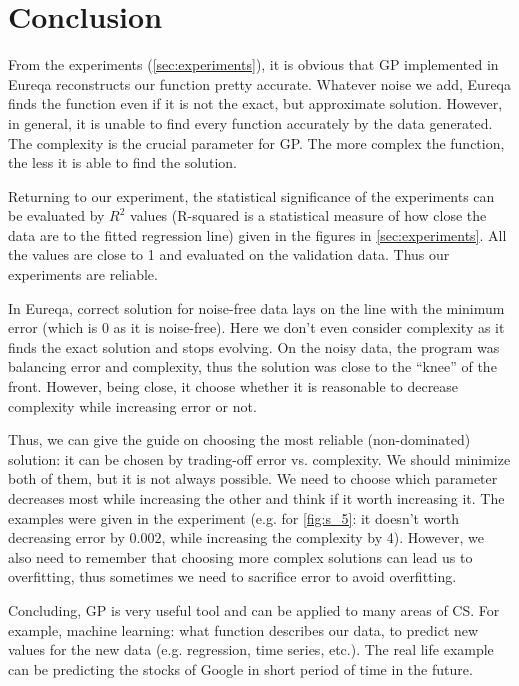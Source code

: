 \documentclass[12pt]{article}
\begin{document}
\section{Conclusion}
    From the experiments (\autoref{sec:experiments}), it is obvious that GP
    implemented in Eureqa reconstructs our function pretty accurate. Whatever
    noise we add, Eureqa finds the function even if it is not the exact, but approximate
    solution. However, in general, it is unable to find every function accurately
    by the data generated. The complexity is the crucial parameter for GP. The more
    complex the function, the less it is able to find the solution.

    Returning to our experiment, the statistical significance of the experiments
    can be evaluated by $R^2$ values (R-squared is a statistical measure of how
    close the data are to the fitted regression line) given in the figures in
    \autoref{sec:experiments}. All the values are close to 1 and evaluated on
    the validation data. Thus our experiments are reliable.

    In Eureqa, correct solution for noise-free data lays on the line with the
    minimum error (which is 0 as it is noise-free). Here we don't even consider
    complexity as it finds the exact solution and stops evolving. On the
    noisy data, the program was balancing error and complexity, thus the solution
    was close to the ``knee'' of the front. However, being close, it choose
    whether it is reasonable to decrease complexity while increasing error or not.

    Thus, we can give the guide on choosing the most reliable (non-dominated)
    solution: it can be chosen by trading-off error vs. complexity. We should
    minimize both of them, but it is not always possible. We need to choose which
    parameter decreases most while increasing the other and think if it worth
    increasing it. The examples were given in the experiment (e.g. for
    \autoref{fig:s_5}: it doesn't worth decreasing error by $0.002$, while
    increasing the complexity by 4). However, we also need to remember that
    choosing more complex solutions can lead us to overfitting, thus sometimes
    we need to sacrifice error to avoid overfitting.

    Concluding, GP is very useful tool and can be applied to many areas of CS.
    For example, machine learning: what function describes our data, to predict
    new values for the new data (e.g. regression, time series, etc.). The real
    life example can be predicting the stocks of Google in short period of time
    in the future.
\end{document}
